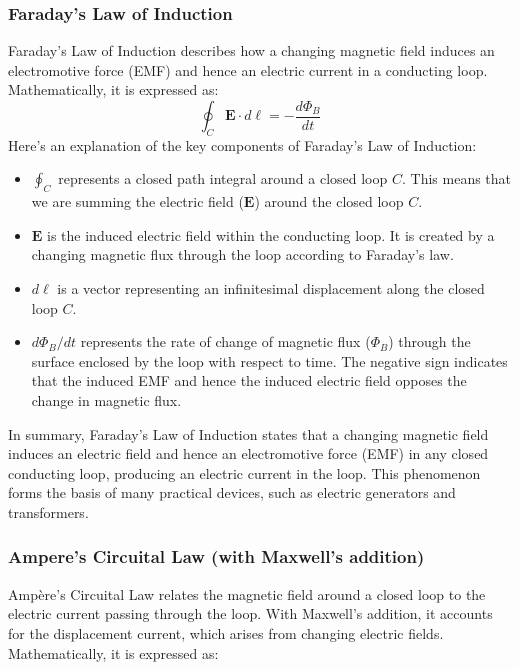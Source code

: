 \subsubsection{Faraday's Law of Induction}
Faraday's Law of Induction describes how a changing magnetic field induces an electromotive force (EMF) and hence an electric current in a conducting loop.
Mathematically, it is expressed as:
\[
\oint_C \mathbf{E} \cdot d\boldsymbol{\ell} = -\frac{d\Phi_B}{dt}
\]
Here's an explanation of the key components of Faraday's Law of Induction:
\begin{itemize}
  \item $\oint_C$ represents a closed path integral around a closed loop $C$. This means that we are summing the electric field ($\mathbf{E}$) around the closed loop $C$.
  
  \item $\mathbf{E}$ is the induced electric field within the conducting loop. It is created by a changing magnetic flux through the loop according to Faraday's law.
  
  \item $d\boldsymbol{\ell}$ is a vector representing an infinitesimal displacement along the closed loop $C$.
  
  \item $d\Phi_B/dt$ represents the rate of change of magnetic flux ($\Phi_B$) through the surface enclosed by the loop with respect to time. The negative sign indicates that the induced EMF and hence the induced electric field opposes the change in magnetic flux.
\end{itemize}

In summary, Faraday's Law of Induction states that a changing magnetic field induces an electric field and hence an electromotive force (EMF) in any closed conducting loop, producing an electric current in the loop. This phenomenon forms the basis of many practical devices, such as electric generators and transformers.


\subsubsection{Ampere's Circuital Law (with Maxwell's addition)}

Amp\`ere's Circuital Law relates the magnetic field around a closed loop to the electric current passing through the loop. With Maxwell's addition, it accounts for the displacement current, which arises from changing electric fields. Mathematically, it is expressed as:


